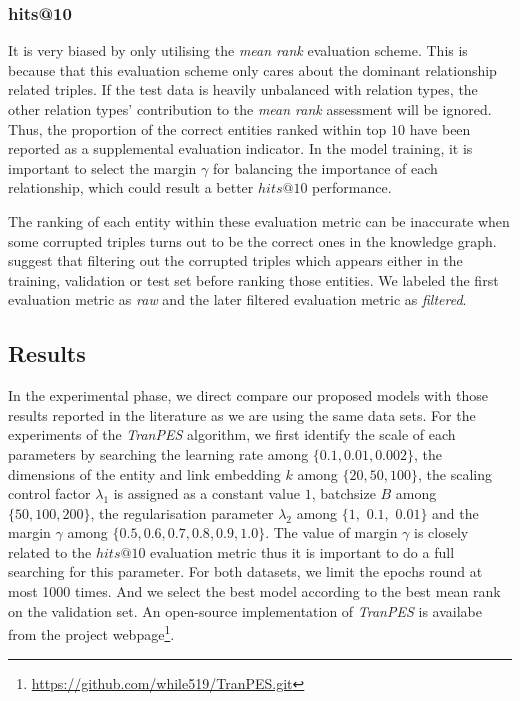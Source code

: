 \documentclass[9pt]{sig-alternate-05-2015}
\begin{document}
\subsubsection{hits@10} 
It is very biased by only utilising the \emph{mean rank} evaluation scheme. This is because that this evaluation scheme only cares about the dominant relationship related triples. If the test data is heavily unbalanced with relation types, the other relation types' contribution to the \emph{mean rank} assessment will be ignored.  Thus, the proportion of the correct entities ranked within top $10$ have been reported as a supplemental evaluation indicator. In the model training, it is important to select the margin $\gamma$ for balancing the importance of each relationship, which could result a better $hits@10$ performance. 

The ranking of each entity within these evaluation metric can be inaccurate when some corrupted triples turns out to be the correct ones in the knowledge graph. \cite{bordes_translating_2013} suggest that filtering out the corrupted triples which appears either in the training, validation or test set before ranking those entities.  We labeled the first evaluation metric as \emph{raw} and the later filtered evaluation metric as \emph{filtered}.


\subsection{Results}
In the experimental phase, we direct compare our proposed models with those results reported in the literature  \cite{lin_learning_2015} as we are using the same data sets. For the experiments of the \emph{TranPES} algorithm, we first identify the scale of each parameters by searching the learning rate among $\{ 0.1, 0.01, 0.002\}$, the dimensions of the entity and link embedding $k$ among $\{ 20, 50, 100 \}$, the scaling control factor $\lambda_1$ is assigned as a constant value $1$, batchsize $B$ among $\{50, 100, 200\}$, the regularisation parameter $\lambda_2$ among $\{ 1,$ $0.1,$ $0.01\}$ and the margin $\gamma$ among $\{0.5, 0.6, 0.7, 0.8, 0.9, 1.0\}$. The value of margin $\gamma$ is closely related to the $hits@10$ evaluation metric thus it is important to do a full searching for this parameter. For both datasets, we limit the epochs round at most 1000 times.  And we select the best model according to the best mean rank on the validation set. An open-source implementation of \emph{TranPES} is availabe from the project webpage\footnote{\url{https://github.com/while519/TranPES.git}}.
\end{document}
